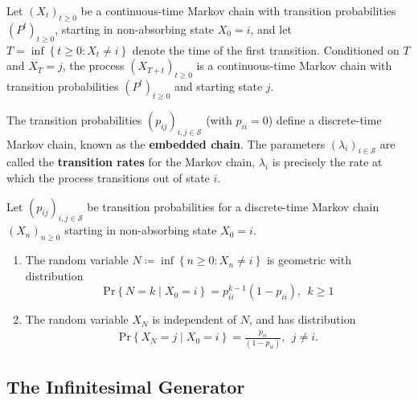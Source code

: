 \begin{thrm}{}{}
Let \((X_t)_{t \geq 0}\) be a continuous-time Markov chain with transition probabilities \((P^t)_{t \geq 0}\), starting in non-absorbing state \(X_0 = i\), and let \(T = \inf \left\{ t \geq 0 : X_{t} \neq i \right\} \) denote the time of the first transition. Conditioned on \(T\) and \(X_{T}  = j\), the process \((X_{T + t})_{t \geq 0}\) is a continuous-time Markov chain with transition probabilities \((P^t)_{t\geq 0}\) and starting state \(j\). 
\end{thrm}

\begin{defn}{}{}
The transition probabilities \((p_{ij} )_{i,j \in  \mathcal{S} }\) (with \(p_{i i } = 0\)) define a discrete-time Markov chain, known as the \textbf{embedded chain}. The parameters \((\lambda _{i} )_{i \in  \mathcal{S} }\) are called the \textbf{transition rates} for the Markov chain, \(\lambda _{i} \) is precisely the rate at which the process transitions out of state \(i\). 
\end{defn}

\begin{lem}{}{}
Let \((p_{ij} )_{i,j \in  \mathcal{S} }\) be transition probabilities for a discrete-time Markov chain \((X_{n} )_{n \geq 0}\) starting in non-absorbing state \(X_0 = i\). 
\begin{enumerate}[label = \emph{(\roman*)}]
    \item The random variable \(N \coloneqq \inf \left\{ n\geq 0: X_{n} \neq i \right\} \) is geometric with distribution 
    \[
        \mathrm{Pr} \left\{ N = k \mid X_0 = i \right\} = p_{i i}^{k- 1} (1 - p_{i i }), \ \ k \geq 1
    \]
    \item The random variable \(X_{N} \) is independent of \(N\), and has distribution
    \begin{align*}
        \mathrm{Pr} \left\{ X_{N} = j \mid X_0 = i \right\}  = \frac{p_{i i }}{(1 - p_{i i})}, \ \ j\neq i.
    \end{align*}
    
\end{enumerate}
\end{lem}

\subsection{The Infinitesimal Generator}

